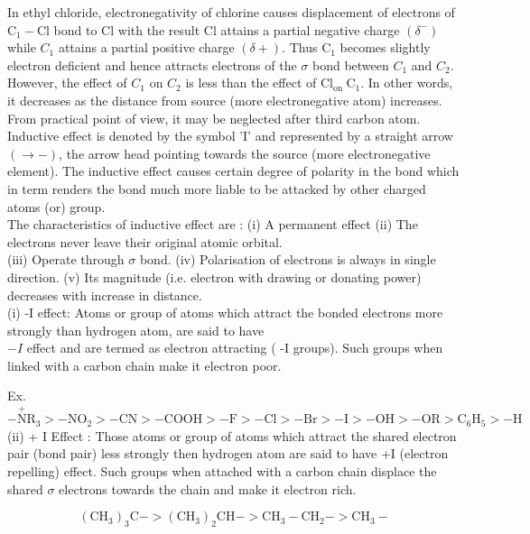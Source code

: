 \documentclass[10pt]{article}
\begin{document}
In ethyl chloride, electronegativity of chlorine causes displacement of electrons of $\mathrm{C}_{1}-\mathrm{Cl}$ bond to Cl with the result Cl attains a partial negative charge $\left(\delta^{-}\right)$while $C_{1}$ attains a partial positive charge $(\delta+)$. Thus $\mathrm{C}_{1}$ becomes slightly electron deficient and hence attracts electrons of the $\sigma$ bond between $C_{1}$ and $C_{2}$. However, the effect of $C_{1}$ on $C_{2}$ is less than the effect of $\mathrm{Cl}_{\text {on }} \mathrm{C}_{1}$. In other words, it decreases as the distance from source (more electronegative atom) increases. From practical point of view, it may be neglected after third carbon atom.\\
Inductive effect is denoted by the symbol 'I' and represented by a straight arrow $(\rightarrow-)$, the arrow head pointing towards the source (more electronegative element). The inductive effect causes certain degree of polarity in the bond which in term renders the bond much more liable to be attacked by other charged atoms (or) group.\\
The characteristics of inductive effect are : (i) A permanent effect (ii) The electrons never leave their original atomic orbital.\\
(iii) Operate through $\sigma$ bond. (iv) Polarisation of electrons is always in single direction. (v) Its magnitude (i.e. electron with drawing or donating power) decreases with increase in distance.\\
(i) -I effect: Atoms or group of atoms which attract the bonded electrons more strongly than hydrogen atom, are said to have\\
$-I$ effect and are termed as electron attracting ( -I groups). Such groups when linked with a carbon chain make it electron poor.

Ex. $-\stackrel{+}{\mathrm{N}} \mathrm{R}_{3}>-\mathrm{NO}_{2}>-\mathrm{CN}>-\mathrm{COOH}>-\mathrm{F}>-\mathrm{Cl}>-\mathrm{Br}>-\mathrm{I}>-\mathrm{OH}>-\mathrm{OR}>\mathrm{C}_{6} \mathrm{H}_{5}>-\mathrm{H}$\\
(ii) + I Effect : Those atoms or group of atoms which attract the shared electron pair (bond pair) less strongly then hydrogen atom are said to have +I (electron repelling) effect. Such groups when attached with a carbon chain displace the shared $\sigma$ electrons towards the chain and make it electron rich.

$$
\left(\mathrm{CH}_{3}\right)_{3} \mathrm{C}->\left(\mathrm{CH}_{3}\right)_{2} \mathrm{CH}->\mathrm{CH}_{3}-\mathrm{CH}_{2}->\mathrm{CH}_{3}-
$$
\end{document}
